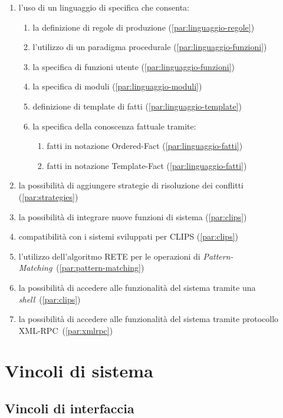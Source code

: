 \begin{enumerate}
	\item l'uso di un linguaggio di specifica che consenta:
		\begin{enumerate}
			\item la definizione di regole di produzione (\ref{par:linguaggio-regole})
			\item l'utilizzo di un paradigma procedurale (\ref{par:linguaggio-funzioni})
			\item la specifica di funzioni utente (\ref{par:linguaggio-funzioni})
			\item la specifica di moduli (\ref{par:linguaggio-moduli})
			\item definizione di template di fatti (\ref{par:linguaggio-template})
			\item la specifica della conoscenza fattuale tramite:
				\begin{enumerate}
					\item fatti in notazione Ordered-Fact (\ref{par:linguaggio-fatti})
					\item fatti in notazione Template-Fact (\ref{par:linguaggio-fatti})
				\end{enumerate}
		\end{enumerate}
	\item la possibilità di aggiungere strategie di risoluzione dei conflitti (\ref{par:strategies})
	\item la possibilità di integrare nuove funzioni di sistema (\ref{par:clips})
	\item compatibilità con i sistemi sviluppati per CLIPS (\ref{par:clips})
	\item l'utilizzo dell'algoritmo RETE per le operazioni di \emph{Pattern-Matching}~(\ref{par:pattern-matching})
	\item la possibilità di accedere alle funzionalità del sistema tramite una \emph{shell}~(\ref{par:clips})
	\item la possibilità di accedere alle funzionalità del sistema tramite protocollo XML-RPC~(\ref{par:xmlrpc})
\end{enumerate}


\section{Vincoli di sistema}
\vincoliinit
\subsection{Vincoli di interfaccia}

